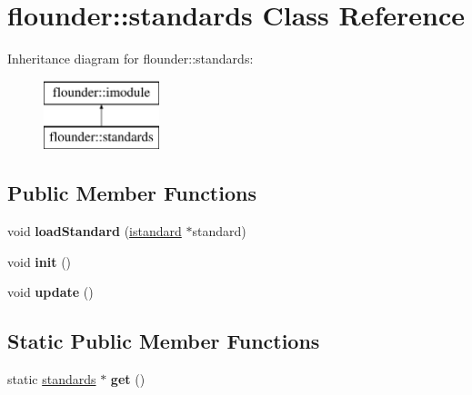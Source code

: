 \hypertarget{classflounder_1_1standards}{}\section{flounder\+:\+:standards Class Reference}
\label{classflounder_1_1standards}
Inheritance diagram for flounder\+:\+:standards\+:\begin{figure}[H]
\begin{center}
\leavevmode
\includegraphics[height=2.000000cm]{classflounder_1_1standards}
\end{center}
\end{figure}
\subsection*{Public Member Functions}
\begin{DoxyCompactItemize}
\item 
\mbox{\label{classflounder_1_1standards_a14c1cbffc50a0ace8d72adf68b00cd45}} 
void {\bfseries load\+Standard} (\hyperlink{classflounder_1_1istandard}{istandard} $\ast$standard)
\item 
\mbox{\label{classflounder_1_1standards_a3d722bf238dde5aed717ad2010b399b8}} 
void {\bfseries init} ()
\item 
\mbox{\label{classflounder_1_1standards_a633285a4fd3d3d535a35859e181b74a3}} 
void {\bfseries update} ()
\end{DoxyCompactItemize}
\subsection*{Static Public Member Functions}
\begin{DoxyCompactItemize}
\item 
\mbox{\label{classflounder_1_1standards_af31cbc5c0616e052b210cc821ebdd8d5}} 
static \hyperlink{classflounder_1_1standards}{standards} $\ast$ {\bfseries get} ()
\end{DoxyCompactItemize}
